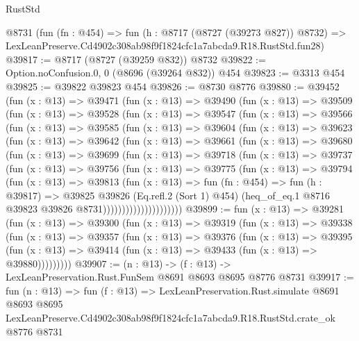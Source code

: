 \begin{lexlean}{RustStd}
\begin{coremodule}
    @8731
    (fun (fn : @454) =>
    fun (h : @8717 (@8727 (@39273 @827)) @8732) =>
    LexLeanPreserve.Cd4902c308ab98f9f1824cfc1a7abcda9.R18.RustStd.fun28)
@39817 := @8717 (@8727 (@39259 @832)) @8732
@39822 := Option.noConfusion.{0, 0} (@8696 (@39264 @832)) @454
@39823 := @3313 @454
@39825 := @39822 @39823 @454
@39826 := @8730 @8776
@39880 := @39452
    (fun (x : @13) =>
    @39471
      (fun (x : @13) =>
      @39490
        (fun (x : @13) =>
        @39509
          (fun (x : @13) =>
          @39528
            (fun (x : @13) =>
            @39547
              (fun (x : @13) =>
              @39566
                (fun (x : @13) =>
                @39585
                  (fun (x : @13) =>
                  @39604
                    (fun (x : @13) =>
                    @39623
                      (fun (x : @13) =>
                      @39642
                        (fun (x : @13) =>
                        @39661
                          (fun (x : @13) =>
                          @39680
                            (fun (x : @13) =>
                            @39699
                              (fun (x : @13) =>
                              @39718
                                (fun (x : @13) =>
                                @39737
                                  (fun (x : @13) =>
                                  @39756
                                    (fun (x : @13) =>
                                    @39775
                                      (fun (x : @13) =>
                                      @39794
                                        (fun (x : @13) =>
                                        @39813
                                          (fun (x : @13) =>
                                          fun (fn : @454) =>
                                          fun (h : @39817) =>
                                          @39825
                                            @39826
                                            (Eq.refl.{2} (Sort 1) @454)
                                            (heq_of_eq.{1}
                                              @8716
                                              @39823
                                              @39826
                                              @8731)))))))))))))))))))))
@39899 := fun (x : @13) =>
  @39281
    (fun (x : @13) =>
    @39300
      (fun (x : @13) =>
      @39319
        (fun (x : @13) =>
        @39338
          (fun (x : @13) =>
          @39357
            (fun (x : @13) =>
            @39376
              (fun (x : @13) =>
              @39395
                (fun (x : @13) => @39414 (fun (x : @13) => @39433 (fun (x : @13) => @39880)))))))))
@39907 := (n : @13) -> (f : @13) -> LexLeanPreservation.Rust.FunSem @8691 @8693 @8695 @8776 @8731
@39917 := fun (n : @13) =>
  fun (f : @13) =>
  LexLeanPreservation.Rust.simulate
    @8691
    @8693
    @8695
    LexLeanPreserve.Cd4902c308ab98f9f1824cfc1a7abcda9.R18.RustStd.crate_ok
    @8776
    @8731
\end{coremodule}
\end{lexlean}
